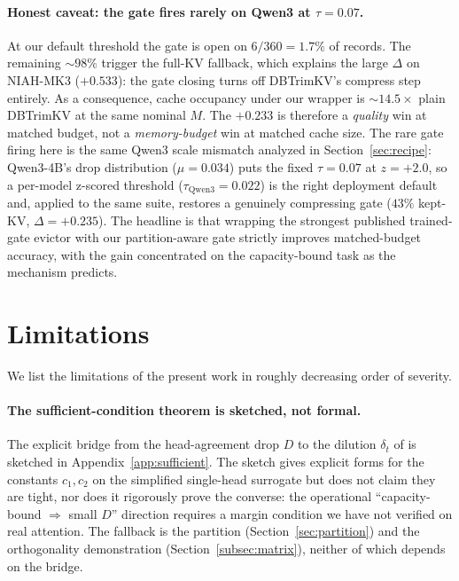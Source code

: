 \documentclass{article}
\begin{document}
\paragraph{Honest caveat: the gate fires rarely on Qwen3 at $\tau = 0.07$.}
At our default threshold the gate is open on $6/360 = 1.7\%$ of
records. The remaining $\sim 98\%$ trigger the full-KV fallback, which
explains the large $\Delta$ on NIAH-MK3 ($+0.533$): the gate closing
turns off DBTrimKV's compress step entirely. As a consequence, cache
occupancy under our wrapper is $\sim 14.5 \times$ plain DBTrimKV at the
same nominal $M$. The $+0.233$ is therefore a \emph{quality} win at
matched budget, not a \emph{memory-budget} win at matched cache size.
The rare gate firing here is the same Qwen3 scale mismatch analyzed in
Section~\ref{sec:recipe}: Qwen3-4B's drop distribution ($\mu = 0.034$)
puts the fixed $\tau = 0.07$ at $z = +2.0$, so a per-model z-scored
threshold ($\tau_{\text{Qwen3}} = 0.022$) is the right deployment
default and, applied to the same suite, restores a genuinely
compressing gate ($43\%$ kept-KV, $\Delta = +0.235$). The headline is that wrapping the strongest
published trained-gate evictor with our partition-aware gate
strictly improves matched-budget accuracy, with the gain concentrated
on the capacity-bound task as the mechanism predicts.

\section{Limitations}
\label{sec:limitations}

We list the limitations of the present work in roughly decreasing
order of severity.

\paragraph{The sufficient-condition theorem is sketched, not formal.}
The explicit bridge from the head-agreement drop $D$ to the dilution
$\delta_t$ of \citet{arxiv260509649} is sketched in Appendix~\ref{app:sufficient}. The sketch
gives explicit forms for the constants $c_1, c_2$ on the simplified
single-head surrogate but does not claim they are tight, nor does it
rigorously prove the converse: the operational ``capacity-bound
$\Rightarrow$ small $D$'' direction requires a margin condition we
have not verified on real attention. The fallback is the partition
(Section~\ref{sec:partition}) and the orthogonality demonstration
(Section~\ref{subsec:matrix}), neither of which depends on the bridge.
\end{document}
